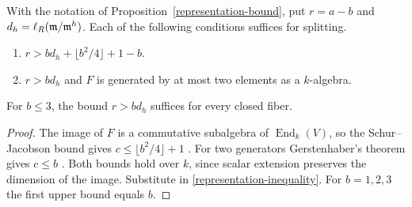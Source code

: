 \begin{corollary}\label{schur-bound}
With the notation of Proposition~\ref{representation-bound}, put
$r=a-b$ and $d_h=\ell_R(\mathfrak m/\mathfrak m^h)$. Each of the following conditions suffices for splitting.
\begin{enumerate}[label=\textup{(\roman*)}]
\item $r>b d_h+\lfloor b^2/4\rfloor+1-b$.
\item $r>b d_h$ and $F$ is generated by at most two elements as a $k$-algebra.
\end{enumerate}
For $b\le3$, the bound $r>b d_h$ suffices for every closed fiber.
\end{corollary}
\begin{proof}
The image of $F$ is a commutative subalgebra of $\operatorname{End}_k(V)$, so the Schur--Jacobson bound gives
$c\le\lfloor b^2/4\rfloor+1$ \cite{Jac}. For two generators Gerstenhaber's theorem gives $c\le b$ \cite{Gerst,Berg}.
Both bounds hold over $k$, since scalar extension preserves the dimension of the image. Substitute in \eqref{representation-inequality}. For $b=1,2,3$ the first upper bound equals $b$.
\end{proof}

